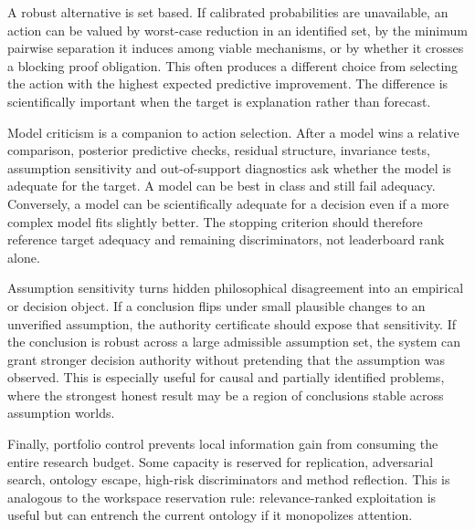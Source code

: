A robust alternative is set based. If calibrated probabilities are unavailable, an action can be valued by worst-case reduction in an identified set, by the minimum pairwise separation it induces among viable mechanisms, or by whether it crosses a blocking proof obligation. This often produces a different choice from selecting the action with the highest expected predictive improvement. The difference is scientifically important when the target is explanation rather than forecast.

Model criticism is a companion to action selection. After a model wins a relative comparison, posterior predictive checks, residual structure, invariance tests, assumption sensitivity and out-of-support diagnostics ask whether the model is adequate for the target. A model can be best in class and still fail adequacy. Conversely, a model can be scientifically adequate for a decision even if a more complex model fits slightly better. The stopping criterion should therefore reference target adequacy and remaining discriminators, not leaderboard rank alone.

Assumption sensitivity turns hidden philosophical disagreement into an empirical or decision object. If a conclusion flips under small plausible changes to an unverified assumption, the authority certificate should expose that sensitivity. If the conclusion is robust across a large admissible assumption set, the system can grant stronger decision authority without pretending that the assumption was observed. This is especially useful for causal and partially identified problems, where the strongest honest result may be a region of conclusions stable across assumption worlds.

Finally, portfolio control prevents local information gain from consuming the entire research budget. Some capacity is reserved for replication, adversarial search, ontology escape, high-risk discriminators and method reflection. This is analogous to the workspace reservation rule: relevance-ranked exploitation is useful but can entrench the current ontology if it monopolizes attention.
